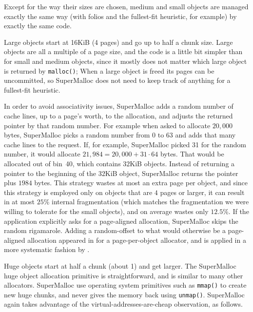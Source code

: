 \documentclass[natbib,sort&compress,10pt]{sigplanconf}
\newcommand{\code}[1]{\texttt{#1}}
\begin{document}
Except for the way their sizes are chosen, medium and small objects
are managed exactly the same way (with folios and the fullest-fit
heuristic, for example) by exactly the same code.


Large objects start at 16KiB (4 pages) and go up to half a chunk size.
Large objects are all a multiple of a page size, and the code is a
little bit simpler than for small and medium objects, since it mostly
does not matter which large object is returned by \code{malloc()};
When a large object is freed its pages can be uncommitted, so
SuperMalloc does not need to keep track of anything for a fullest-fit
heuristic.

In order to avoid associativity issues, SuperMalloc adds a random
number of cache lines, up to a page's worth, to the allocation, and
adjusts the returned pointer by that random number.  For example when
asked to allocate $20,000$ bytes, SuperMalloc picks a random number
from 0 to 63 and adds that many cache lines to the request.  If, for
example, SuperMalloc picked 31 for the random number, it would
allocate $21,984 = 20,000+31\cdot64$ bytes.  That would be allocated
out of bin~40, which contains $32$KiB objects.  Instead of returning a
pointer to the beginning of the $32$KiB object, SuperMalloc returns
the pointer plus $1984$ bytes.  This strategy wastes at most an extra
page per object, and since this strategy is employed only on objects
that are $4$ pages or larger, it can result in at most $25$\% internal
fragmentation (which matches the fragmentation we were willing to
tolerate for the small objects), and on average wastes only $12.5$\%.
If the application explicitly asks for a page-aligned allocation,
SuperMalloc skips the random rigamarole.  Adding a random-offset to
what would otherwise be a page-aligned allocation appeared in
\cite{LvinNoBe08} for a page-per-object allocator, and is applied in a
more systematic fashion by \cite{AfekDiMo11}.


Huge objects start at half a chunk (about \unit{1}\mebi\byte{}) and
get larger.  The SuperMalloc huge object allocation primitive is
straightforward, and is similar to many other allocators.  SuperMalloc
use operating system primitives such as \code{mmap()} to create new
huge chunks, and never gives the memory back using \code{unmap()}.
SuperMalloc again takes advantage of the virtual-addresses-are-cheap
observation, as follows.
\end{document}
